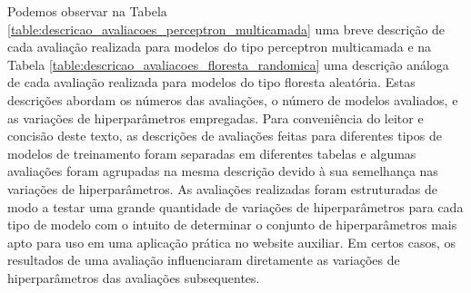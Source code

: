 Podemos observar na Tabela \ref{table:descricao_avaliacoes_perceptron_multicamada} uma breve descrição de cada avaliação realizada para modelos do tipo perceptron multicamada e na Tabela \ref{table:descricao_avaliacoes_floresta_randomica} uma descrição análoga de cada avaliação realizada para modelos do tipo floresta aleatória. Estas descrições abordam os números das avaliações, o número de modelos avaliados, e as variações de hiperparâmetros empregadas. Para conveniência do leitor e concisão deste texto, as descrições de avaliações feitas para diferentes tipos de modelos de treinamento foram separadas em diferentes tabelas e algumas avaliações foram agrupadas na mesma descrição devido à sua semelhança nas variações de hiperparâmetros. As avaliações realizadas foram estruturadas de modo a testar uma grande quantidade de variações de hiperparâmetros para cada tipo de modelo com o intuito de determinar o conjunto de hiperparâmetros mais apto para uso em uma aplicação prática no website auxiliar. Em certos casos, os resultados de uma avaliação influenciaram diretamente as variações de hiperparâmetros das avaliações subsequentes.

